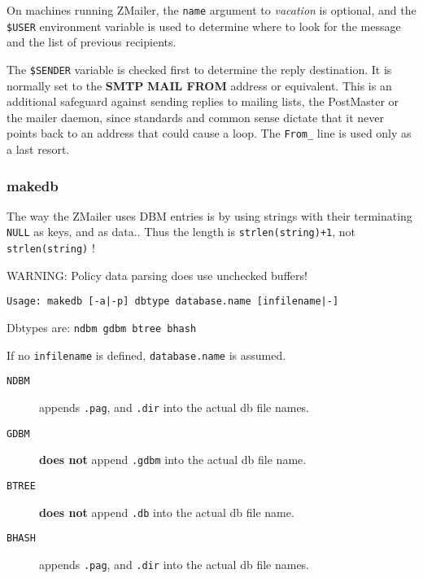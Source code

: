 On machines running ZMailer, the {\tt name} argument 
to {\em vacation\/} is optional, and the {\tt \$USER} 
environment variable is used to determine where to look for the 
message and the list of previous recipients.

The {\tt \$SENDER} variable is checked first to determine 
the reply destination. It is normally set to the {\bf SMTP} 
{\bf MAIL FROM} address or equivalent. This is an additional 
safeguard against sending replies to mailing lists, the PostMaster 
or the mailer daemon, since standards and common sense dictate that 
it never points back to an address that could cause a loop. The 
{\tt From\_} line is used only as a last resort.




\subsubsection{makedb}



The way the ZMailer uses DBM entries is by using strings with 
their terminating {\tt NULL} as keys, and as data.. Thus 
the length is {\tt strlen(string)+1}, not {\tt strlen(string)} !

WARNING: Policy data parsing does use unchecked buffers!

\begin{verbatim}
Usage: makedb [-a|-p] dbtype database.name [infilename|-]
\end{verbatim}


Dbtypes are: {\tt ndbm gdbm btree bhash}

If no {\tt infilename} is defined, {\tt database.name} is assumed.

\begin{description}
\item[{\tt NDBM}] \mbox{}

appends {\tt .pag}, and {\tt .dir}
into the actual db file names.

\item[{\tt GDBM}] \mbox{}

{\bf does not} append {\tt .gdbm}
into the actual db file name.

\item[{\tt BTREE}] \mbox{}

{\bf does not} append {\tt .db}
into the actual db file name.

\item[{\tt BHASH}] \mbox{}

appends {\tt .pag}, and {\tt .dir}
into the actual db file names.

\end{description}


